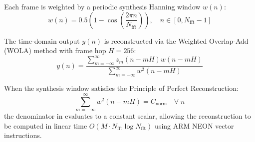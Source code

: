 Each frame is weighted by a periodic synthesis Hanning window $w(n)$:
\begin{equation}
    w(n) = 0.5 \left( 1 - \cos\left( \frac{2\pi n}{N_{\text{fft}}} \right) \right), \quad n \in [0, N_{\text{fft}}-1]
    \label{eq:app_hanning}
\end{equation}

The time-domain output $y(n)$ is reconstructed via the Weighted Overlap-Add (WOLA) method with frame hop $H = 256$:
\begin{equation}
    y(n) = \frac{\sum_{m=-\infty}^\infty z_m(n - mH) w(n - mH)}{\sum_{m=-\infty}^\infty w^2(n - mH)}
    \label{eq:app_wola}
\end{equation}

When the synthesis window satisfies the Principle of Perfect Reconstruction:
\begin{equation}
    \sum_{m=-\infty}^\infty w^2(n - mH) = C_{\text{norm}} \quad \forall \; n
\end{equation}
the denominator in  evaluates to a constant scalar, allowing the reconstruction to be computed in linear time $O(M \cdot N_{\text{fft}} \log N_{\text{fft}})$ using ARM NEON vector instructions.
